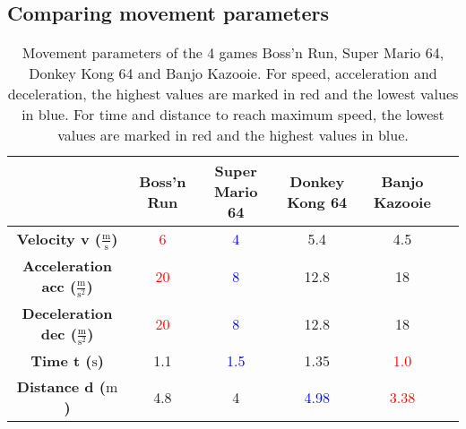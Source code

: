 \documentclass[letterpaper, 10 pt, conference]{ieeeconf}  %
\begin{document}
\subsection{Comparing movement parameters}



\begin{table*}[htbp]
    \centering
    \begin{tabular}{cccccc}
    \toprule
     & \textbf{Boss'n Run} & \textbf{Super Mario 64} & \textbf{Donkey Kong 64} & \textbf{Banjo Kazooie} \\
    \midrule
    \textbf{Velocity v ($\frac{\mathrm{m}}{\mathrm{s}}$)} & \textcolor{red}{6} & \textcolor{blue}{4} & 5.4 & 4.5 \\
    \textbf{Acceleration acc ($\frac{\mathrm{m}}{\mathrm{s^2}}$)} & \textcolor{red}{20} & \textcolor{blue}{8} & 12.8 & 18 \\
    \textbf{Deceleration dec ($\frac{\mathrm{m}}{\mathrm{s^2}}$)} & \textcolor{red}{20} & \textcolor{blue}{8} & 12.8 & 18 \\
    \textbf{Time t ($\mathrm{s}$)} & 1.1 & \textcolor{blue}{1.5} & 1.35 & \textcolor{red}{1.0} \\
    \textbf{Distance d ($\mathrm{m}$)} & 4.8 & 4 & \textcolor{blue}{4.98} & \textcolor{red}{3.38} \\
    \bottomrule
    \end{tabular}
    \caption{Movement parameters of the 4 games Boss'n Run, Super Mario 64, Donkey Kong 64 and Banjo Kazooie. 
    For speed, acceleration and deceleration, the highest values are marked in red and the lowest values in blue.
    For time and distance to reach maximum speed, the lowest values are marked in red and the highest values in blue.}
    \label{tab:insightII}
\end{table*}
\end{document}
